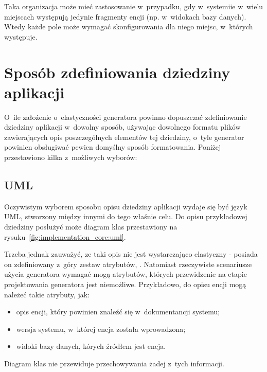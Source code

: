 

Taka organizacja może mieć zastosowanie w~przypadku, gdy w~systemiie w~wielu miejscach występują jedynie fragmenty encji (np. w~widokach bazy danych).
Wtedy każde pole może wymagać skonfigurowania dla niego miejsc, w~których występuje.



\section{Sposób zdefiniowania dziedziny aplikacji} \label{sec:core:domain_definition}

O~ile założenie o~elastyczności generatora powinno dopuszczać zdefiniowanie dziedziny aplikacji w~dowolny sposób, używając dowolnego formatu plików zawierających opis poszczególnych elementów tej dziedziny, o~tyle generator powinien obsługiwać pewien domyślny sposób formatowania.
Poniżej przestawiono kilka z~możliwych wyborów:

\subsection{UML}

Oczywistym wyborem sposobu opisu dziedziny aplikacji wydaje się być język UML, stworzony między innymi do tego właśnie celu.
Do opisu przykładowej dziedziny posłużyć może diagram klas przestawiony na rysuku~\ref{fig:implementation_core:uml}.



Trzeba jednak zauważyć, ze taki opis nie jest wystarczająco elastyczny - posiada on zdefiniowany z~góry zestaw atrybutów, .
Natomiast rzeczywiste scenariusze użycia generatora wymagać mogą atrybutów, których przewidzenie na etapie projektowania generatora jest niemożliwe.
Przykładowo, do opisu encji mogą należeć takie atrybuty, jak:

\begin{itemize}
 \item opis encji, który powinien znaleźć się w~dokumentancji systemu;
 \item wersja systemu, w~której encja została wprowadzona;
 \item widoki bazy danych, kórych źródłem jest encja.
\end{itemize}

Diagram klas nie przewiduje przechowywania żadej z~tych informacji.

